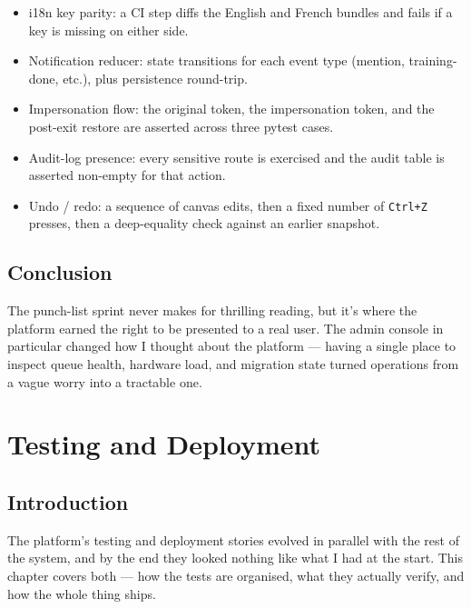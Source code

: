 \documentclass[12pt, a4paper]{report}
\begin{document}
\begin{itemize}
    \item i18n key parity: a CI step diffs the English and French
        bundles and fails if a key is missing on either side.
    \item Notification reducer: state transitions for each event
        type (mention, training-done, etc.), plus persistence
        round-trip.
    \item Impersonation flow: the original token, the
        impersonation token, and the post-exit restore are
        asserted across three pytest cases.
    \item Audit-log presence: every sensitive route is exercised
        and the audit table is asserted non-empty for that
        action.
    \item Undo / redo: a sequence of canvas edits, then a fixed
        number of \texttt{Ctrl+Z} presses, then a deep-equality
        check against an earlier snapshot.
\end{itemize}

\section*{Conclusion}

The punch-list sprint never makes for thrilling reading, but it's
where the platform earned the right to be presented to a real
user. The admin console in particular changed how I thought about
the platform --- having a single place to inspect queue health,
hardware load, and migration state turned operations from a vague
worry into a tractable one.

\chapter{Testing and Deployment}

\section*{Introduction}

The platform's testing and deployment stories evolved in parallel
with the rest of the system, and by the end they looked nothing
like what I had at the start. This chapter covers both --- how the
tests are organised, what they actually verify, and how the whole
thing ships.
\end{document}
